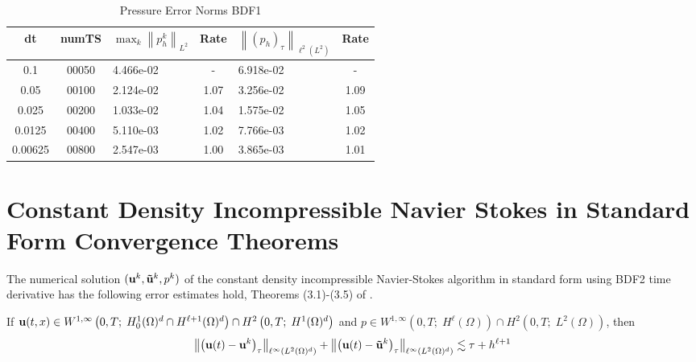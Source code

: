 \documentclass[letterpaper]{erdc}
\begin{document}
\begin{table}[h!]
  \begin{center}
    \caption{Pressure Error Norms BDF1}
    \begin{tabular}{c|c|l|c|l|c}
      dt & numTS &  $\displaystyle\max_{k} \left\|p^{k}_{h}\right\|_{L^2}$ &  Rate  &  $\left\|\left(p_h\right)_{\tau}\right\|_{\ell^2(L^2)}$  &  Rate\\
      \hline
      0.1     & 00050 & 4.466e-02 &   -  & 6.918e-02 &   - \\
      0.05    & 00100 & 2.124e-02 & 1.07 & 3.256e-02 & 1.09\\
      0.025   & 00200 & 1.033e-02 & 1.04 & 1.575e-02 & 1.05\\
      0.0125  & 00400 & 5.110e-03 & 1.02 & 7.766e-03 & 1.02\\
      0.00625 & 00800 & 2.547e-03 & 1.00 & 3.865e-03 & 1.01
    \end{tabular}
  \end{center}
\end{table}





\section{Constant Density Incompressible Navier Stokes in Standard Form Convergence Theorems}

The numerical solution $(\textbf{u}^k, \mathbf{\tilde{u}}^k,p^k)$ of the constant density incompressible Navier-Stokes algorithm in standard form using BDF2 time derivative has the following error estimates hold, Theorems (3.1)-(3.5) of \cite{guermond1997resultat}.

\begin{theorem}\label{thm:guermondthm3.1}
If $\textbf{u}(t,x)\in W^{1,\infty}\left(0,T;\; H_0^1(\Omega)^d \cap H^{\ell+1}(\Omega)^d  \right) \cap H^2\left(0,T;\; H^1(\Omega)^d\right)$ and $p\in W^{1,\infty}\left(0,T;\; H^{\ell}(\Omega) \right)\cap H^2\left(0,T;\; L^2(\Omega)\right)$, then
  \begin{equation}
    \left\| \left(\textbf{u}(t) - \textbf{u}^k \right)_{\tau} \right\|_{\ell^{\infty}\left(L^2(\Omega)^d\right)} + \left\| \left(\textbf{u}(t) - \mathbf{\tilde{u}}^k \right)_{\tau} \right\|_{\ell^{\infty}\left(L^2(\Omega)^d\right)} \lesssim \tau + h^{\ell+1}
  \end{equation}
\end{theorem}
\end{document}

